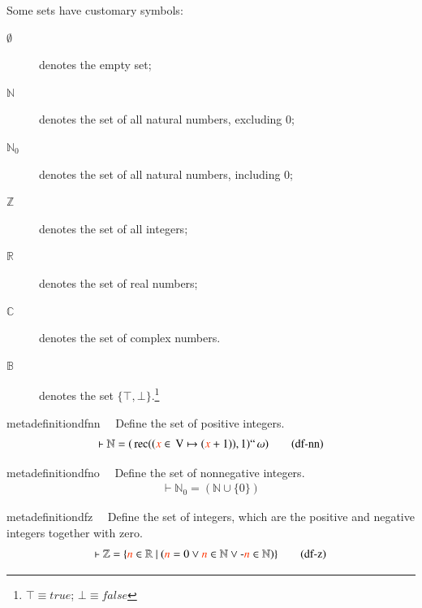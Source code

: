 \pn Some sets have customary symbols: 
\begin{description}
\item[$\emptyset$] denotes the empty 
set;
\item[$\mathbb{N}$] denotes the set of all natural numbers, excluding 0; 
\item[$\mathbb{N}_0$] denotes the set of all natural numbers, including 0; 
\item[$\mathbb{Z}$] denotes the set of all integers; 
\item[$\mathbb{R}$] denotes the set of real numbers;
\item[$\mathbb{C}$] denotes the set of complex numbers.
\item[$\mathbb{B}$] denotes the set \(\{\top, \bot\}\).\footnote{$\top \equiv true$; $\bot \equiv false$}
\end{description}

\begin{restatable}{metadefinition}{dfnn}~~ Define the set of positive integers.  
\begin{align}
\vdash \mathbb{N} = ( \,\mathrm{rec} ( ( \msc{x} \in \,\mathrm{V} \mapsto (
    \msc{x} + 1 ) ) , 1 ) `` \,\mathrm{\omega} )\label{eq:df-nn}\tag{df-nn}
\end{align}
\end{restatable}

\begin{restatable}{metadefinition}{dfno}~~ Define the set of nonnegative integers. 
\begin{align}
\vdash \mathbb{N}_0 = ( \mathbb{N} \cup \{ 0 \} )\label{eq:df-n0}\tag{df-n0}
\end{align}
\end{restatable}

\begin{restatable}{metadefinition}{dfz}~~ Define the set of integers, which are the
positive and negative integers together with zero.  
\begin{align}
\vdash \mathbb{Z} = \{ \msc{n} \in \mathbb{R}~\vert~( \msc{n} = 0 \vee \msc{n} \in
    \mathbb{N} \vee \textrm{-} \msc{n} \in \mathbb{N} )
    \}\label{eq:df-z}\tag{df-z}
\end{align}
\end{restatable}

